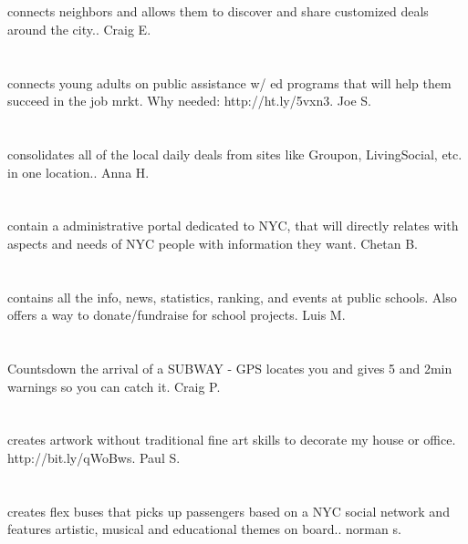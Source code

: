 \section{}connects neighbors and allows them to discover and share customized deals around the city.. Craig E.
\section{}connects young adults on public assistance w/ ed programs that will help them succeed in the job mrkt. Why needed: http://ht.ly/5vxn3. Joe S.
\section{}  consolidates all of the local daily deals from sites like Groupon,  LivingSocial,  etc. in one location.. Anna H.
\section{}contain a administrative portal dedicated to NYC,  that will directly relates with aspects and needs of NYC people with information they want. Chetan B.
\section{}contains all the info,  news,  statistics,  ranking,  and events at public schools. Also offers a way to donate/fundraise for school projects. Luis M.
\section{}Countsdown the arrival of a SUBWAY - GPS locates you and gives 5 and 2min warnings so you can catch it. Craig P.
\section{}creates artwork without traditional fine art skills to decorate my house or office. http://bit.ly/qWoBws. Paul S.
\section{}creates flex buses that picks up passengers based on a NYC social network and features artistic,  musical  and educational themes on board.. norman s.
